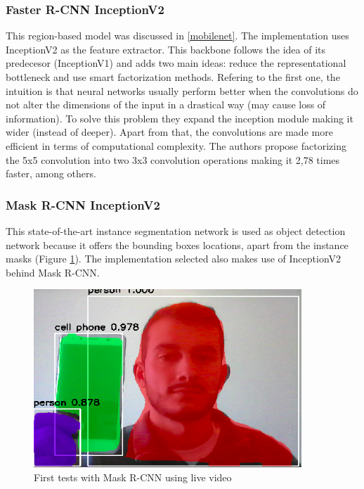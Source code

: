 \subsubsection{Faster R-CNN InceptionV2}
This region-based model was discussed in \ref{mobilenet}. The implementation uses InceptionV2 \cite{szegedy2016rethinking} as the feature extractor. This backbone follows the idea of its predecesor (InceptionV1) and adds two main ideas: reduce the representational bottleneck and use smart factorization methods. Refering to the first one, the intuition is that neural networks usually perform better when the convolutions do not alter the dimensions of the input in a drastical way (may cause loss of information). To solve this problem they expand the inception module making it wider (instead of deeper). Apart from that, the convolutions are made more efficient in terms of computational complexity. The authors propose factorizing the 5x5 convolution into two 3x3 convolution operations making it 2,78 times faster, among others.
\subsubsection{Mask R-CNN InceptionV2}
This state-of-the-art instance segmentation network is used as object detection network because it offers the bounding boxes locations, apart from the instance masks (Figure \ref{fig:maskrcnn_tests}). The implementation selected also makes use of InceptionV2 behind Mask R-CNN.
\begin{figure}[H]
\begin{center}
\includegraphics[scale=0.5]{figures/maskrcnn_first_tests.png}
\caption{First tests with Mask R-CNN using live video}
\label{fig:maskrcnn_tests}
\end{center}
\end{figure} 
